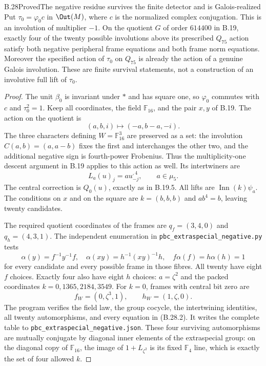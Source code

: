 \begin{statement}{B.28}{Proved}{The negative residue survives the finite detector and is Galois-realized}
Put $\tau_0=\varphi_0c$ in $\Out(M)$, where $c$ is the
normalized complex conjugation. This is an involution of
multiplier $-1$. On the quotient $G$ of order $614400$ in
B.19, exactly four of the twenty possible involutions above
its prescribed $Q_{75}$ action satisfy both negative
peripheral frame equations and both frame norm equations.
Moreover the specified action of $\tau_0$ on $Q_{75}$ is
already the action of a genuine Galois involution.
These are finite survival statements, not a construction
of an involutive full lift of $\tau_0$.
\end{statement}
\begin{proof}
The unit $\beta_0$ is invariant under $*$ and has square
one, so $\varphi_0$ commutes with $c$ and $\tau_0^2=1$.
Keep all coordinates, the field $\mathbb F_{16}$, and the
pair $x,y$ of B.19. The action on the quotient is
\[
 (a,b,i)\longmapsto(-a,b-a,-i).
 \tag{B.28.1}
\]
The three characters defining $W=\mathbb F_{16}^3$ are
preserved as a set: the involution $C(a,b)=(a,a-b)$
fixes the first and interchanges the other two, and the
additional negative sign is fourth-power Frobenius.
Thus the multiplicity-one descent argument in B.19
applies to this action as well. Its intertwiners are
\[
        L_a(u)_j=a u_{-j}^{,4},\qquad a\in\mu_5.
\]
The central correction is $Q_0(u)$, exactly as in
B.19.5. All lifts are $\operatorname{Inn}(k)\psi_a$.
The conditions on $x$ and on the square are
$k=(b,b,b)$ and $ab^4=b$, leaving twenty candidates.

The required quotient coordinates of the frames are
$q_f=(3,4,0)$ and $q_h=(4,3,1)$. The independent
enumeration in \texttt{pbc\_extraspecial\_negative.py}
tests
\[
 \alpha(y)=f^{-1}y^{-1}f,\quad
 \alpha(xy)=h^{-1}(xy)^{-1}h,\quad
 f\alpha(f)=h\alpha(h)=1
 \tag{B.28.2}
\]
for every candidate and every possible frame in those
fibres. All twenty have eight $f$ choices. Exactly four
also have eight $h$ choices: $a=\zeta^2$ and the packed
coordinates $k=0,1365,2184,3549$. For $k=0$, frames with
central bit zero are
\[
       f_W=(0,\zeta^3,1),\qquad h_W=(1,\zeta,0).
\]
The program verifies the field law, the group cocycle,
the intertwining identities, all twenty automorphisms,
and every equation in (B.28.2). It writes the complete
table to \texttt{pbc\_extraspecial\_negative.json}.
These four surviving automorphisms are mutually conjugate
by diagonal inner elements of the extraspecial group:
on the diagonal copy of $\mathbb F_{16}$, the image of
$1+L_{\zeta^2}$ is its fixed $\mathbb F_4$ line, which
is exactly the set of four allowed $k$.


\end{proof}
